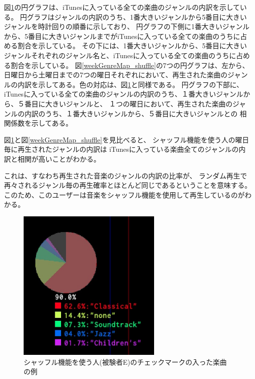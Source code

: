 \documentclass[11pt, onecolumn]{jsarticle}
\begin{document}
図\ref{checkedItemsGenreMap_shuffle}の円グラフは、iTunesに入っている全ての楽曲のジャンルの内訳を示している。
円グラフはジャンルの内訳のうち、1番大きいジャンルから5番目に大きいジャンルを時計回りの順番に示しており、
円グラフの下側に1番大きいジャンルから、5番目に大きいジャンルまでがiTunesに入っている全ての楽曲のうちに占める割合を示している。
その下には、1番大きいジャンルから、5番目に大きいジャンルそれぞれのジャンル名と、iTunesに入っている全ての楽曲のうちに占める割合を示している。
図\ref{weekGenreMap_shuffle}の7つの円グラフは、左から、日曜日から土曜日までの7つの曜日それぞれにおいて、再生された楽曲のジャンルの内訳を示してある。色の対応は、図\ref{checkedItemsGenreMap_shuffle}と同様である。
円グラフの下部に、
iTunesに入っている全ての楽曲のジャンルの内訳のうち、１番大きいジャンルから、５番目に大きいジャンルと、
１つの曜日において、再生された楽曲のジャンルの内訳のうち、１番大きいジャンルから、５番目に大きいジャンルとの
相関係数を示してある。

図\ref{checkedItemsGenreMap_shuffle}と図\ref{weekGenreMap_shuffle}を見比べると、
シャッフル機能を使う人の曜日毎に再生されたジャンルの内訳は
iTunesに入っている楽曲全てのジャンルの内訳と相関が高いことがわかる。

これは、すなわち再生された音楽のジャンルの内訳の比率が、
ランダム再生で再々されるジャンル毎の再生確率とほとんど同じであるということを意味する。
このため、このユーザーは音楽をシャッフル機能を使用して再生しているのがわかる。


\clearpage

\begin{figure}[h]
\begin{center}
\includegraphics[width=7cm]{taru_checkedItemGenreRatio.jpg}
\caption{シャッフル機能を使う人(被験者E)のチェックマークの入った楽曲の例}
\label{checkedItemsGenreMap_shuffle}
\end{center}
\end{figure}
\end{document}

